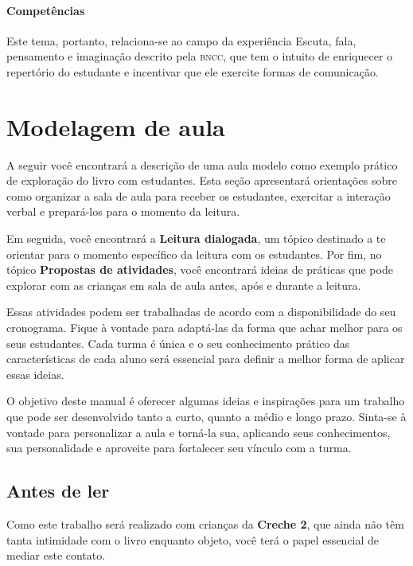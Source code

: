 \documentclass[11pt]{extarticle}
\begin{document}
\paragraph{Competências} Este tema, portanto, 
relaciona-se ao campo da experiência Escuta, fala, pensamento e imaginação 
descrito pela \textsc{bncc}, que tem o intuito de enriquecer o repertório do estudante 
e incentivar que ele exercite formas de comunicação.


\section{Modelagem de aula}
A seguir você encontrará a descrição de uma aula modelo como exemplo 
prático de exploração do livro com estudantes. Esta seção apresentará 
orientações sobre como organizar a sala de aula para receber os 
estudantes, exercitar a interação verbal e prepará-los para o 
momento da leitura.

Em seguida, você encontrará a \textbf{Leitura dialogada}, um 
tópico destinado a te orientar para o momento específico da 
leitura com os estudantes. Por fim, no tópico 
\textbf{Propostas de atividades}, você encontrará ideias 
de práticas que pode explorar com as crianças em sala de 
aula antes, após e durante a leitura. 

Essas atividades podem ser trabalhadas de acordo com a 
disponibilidade do seu cronograma. Fique à vontade para adaptá-las 
da forma que achar melhor para os seus estudantes. Cada turma é única 
e o seu conhecimento prático das características de cada aluno será 
essencial para definir a melhor forma de aplicar essas ideias. 

O objetivo deste manual é oferecer algumas ideias 
e inspirações para um trabalho que pode ser desenvolvido tanto 
a curto, quanto a médio e longo prazo. Sinta-se à vontade para 
personalizar a aula e torná-la sua, aplicando seus conhecimentos, sua 
personalidade e aproveite para fortalecer 
seu vínculo com a turma.


\subsection{Antes de ler}


Como este trabalho será realizado com crianças da \textbf{Creche 2}, 
que ainda não têm tanta intimidade com o livro enquanto objeto, você terá o 
papel essencial de mediar este contato. 
\end{document}

